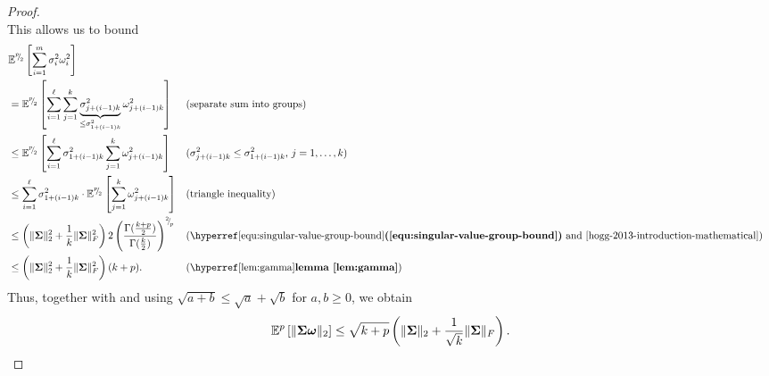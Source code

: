 \documentclass[12pt]{article}
\begin{document}
\begin{proof}
\begin{equation}
    \end{equation}
    This allows us to bound
    \begin{align}
        &\mathbb{E}^{\sfrac{p}{2}}\left[ \sum_{i=1}^{m} \sigma_i^2 \omega_i^2 \right] \notag \\
        &= \mathbb{E}^{\sfrac{p}{2}}\left[ \sum_{i=1}^{\ell} \sum_{j=1}^{k} \underbrace{\sigma_{j + (i-1)k}^2}_{\leq \sigma_{1 + (i-1)k}^2} \omega_{j + (i-1)k}^2 \right] && \text{(separate sum into groups)} \notag \\
        &\leq \mathbb{E}^{\sfrac{p}{2}}\left[ \sum_{i=1}^{\ell} \sigma_{1 + (i-1)k}^2 \sum_{j=1}^{k} \omega_{j + (i-1)k}^2 \right] && \text{($\sigma_{j + (i-1)k}^2 \leq \sigma_{1 + (i-1)k}^2$, $j=1, \dots, k$)} \notag \\
        &\leq \sum_{i=1}^{\ell} \sigma_{1 + (i-1)k}^2 \cdot \mathbb{E}^{\sfrac{p}{2}}\left[ \sum_{j=1}^{k} \omega_{j + (i-1)k}^2 \right] && \text{(triangle inequality)} \notag \\
        &\leq \left( \lVert \mtx{\Sigma} \rVert _2^2 + \frac{1}{k} \lVert \mtx{\Sigma} \rVert _F^2 \right) 2 \left( \frac{\Gamma(\frac{k + p}{2})}{\Gamma(\frac{k}{2})} \right)^{\sfrac{2}{p}} && \text{(\refequ{equ:singular-value-group-bound} and \cite[theorem 3.3.2]{hogg-2013-introduction-mathematical})} \notag \\
        &\leq \left( \lVert \mtx{\Sigma} \rVert _2^2 + \frac{1}{k} \lVert \mtx{\Sigma} \rVert _F^2 \right) (k + p). && \text{(\reflem{lem:gamma})}
    \end{align}
    Thus, together with  and using $\sqrt{a+b} \leq \sqrt{a} + \sqrt{b}$ for $a, b \geq 0$, we obtain
    \begin{equation}
        \mathbb{E}^{p}\left[ \lVert \boldsymbol{\Sigma} \boldsymbol{\omega} \rVert _2 \right]
        \leq \sqrt{k + p} \left( \lVert \boldsymbol{\Sigma} \rVert _2 + \frac{1}{\sqrt{k}} \lVert \boldsymbol{\Sigma} \rVert _F \right).
        \label{equ:matvec-spectral-norm-moment-bound}
    \end{equation}


\end{proof}
\end{document}
